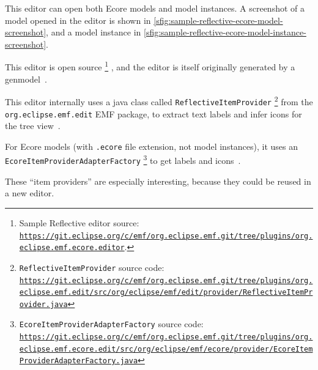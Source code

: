 This editor can open both \gls{Ecore} models and model instances.
A screenshot of a model opened in the editor is shown in \cref{sfig:sample-reflective-ecore-model-screenshot}, and a model instance in \cref{sfig:sample-reflective-ecore-model-instance-screenshot}.


This editor is \gls{open source}%
\footnote{Sample Reflective editor source: \href{https://git.eclipse.org/c/emf/org.eclipse.emf.git/tree/plugins/org.eclipse.emf.ecore.editor}{\nolinkurl{https://git.eclipse.org/c/emf/org.eclipse.emf.git/tree/plugins/org.eclipse.emf.ecore.editor}}.}%
, and the editor is itself originally generated by a genmodel~\cite[p.~10]{rekstadModelingEnvironmentCloud2020}.


This editor internally uses a java class called \texttt{ReflectiveItemProvider}%
\footnote{\texttt{ReflectiveItemProvider} source code: \href{https://git.eclipse.org/c/emf/org.eclipse.emf.git/tree/plugins/org.eclipse.emf.edit/src/org/eclipse/emf/edit/provider/ReflectiveItemProvider.java}{\nolinkurl{https://git.eclipse.org/c/emf/org.eclipse.emf.git/tree/plugins/org.eclipse.emf.edit/src/org/eclipse/emf/edit/provider/ReflectiveItemProvider.java}}}
from the \texttt{org.eclipse.emf.edit} \acrshort{EMF} package, to extract text labels and infer icons for the tree view~\cite[p.~10]{rekstadModelingEnvironmentCloud2020}.


For \gls{Ecore} models (with \texttt{.ecore} file extension, not model instances), it uses an \texttt{EcoreItemProviderAdapterFactory}%
\footnote{\texttt{EcoreItemProviderAdapterFactory} source code: \href{https://git.eclipse.org/c/emf/org.eclipse.emf.git/tree/plugins/org.eclipse.emf.ecore.edit/src/org/eclipse/emf/ecore/provider/EcoreItemProviderAdapterFactory.java}{\nolinkurl{https://git.eclipse.org/c/emf/org.eclipse.emf.git/tree/plugins/org.eclipse.emf.ecore.edit/src/org/eclipse/emf/ecore/provider/EcoreItemProviderAdapterFactory.java}}}
to get labels and icons~\cite{edmerksEcoreEditorJava2021}.


These ``item providers'' are especially interesting, because they could be reused in a new editor.

